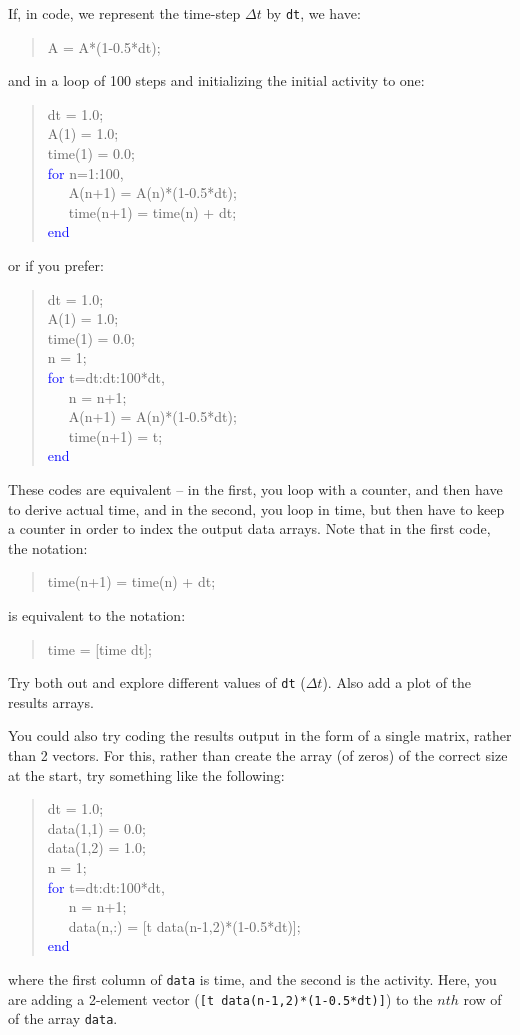 \documentclass{tufte-book} %
\newenvironment{docspec}{\begin{quotation}\ttfamily\parskip0pt\parindent0pt\ignorespaces}{\end{quotation}}
\begin{document}
\noindent If, in code, we represent the time-step \(\Delta t\) by \texttt{dt}, we have:
\begin{docspec}
A = A*(1-0.5*dt);
\end{docspec}
and in a loop of 100 steps and initializing the initial activity to one:
\begin{docspec}
dt = 1.0;\\
A(1) = 1.0;\\
time(1) = 0.0;\\
\textcolor{blue}{for} n=1:100,\\
\ \ \ A(n+1) = A(n)*(1-0.5*dt);\\
\ \ \ time(n+1) = time(n) + dt;\\
\textcolor{blue}{end}
\end{docspec}
or if you prefer:
\begin{docspec}
dt = 1.0;\\
A(1) = 1.0;\\
time(1) = 0.0;\\
n = 1;\\
\textcolor{blue}{for} t=dt:dt:100*dt,\\
\ \ \ n = n+1;\\
\ \ \ A(n+1) = A(n)*(1-0.5*dt);\\
\ \ \ time(n+1) = t;\\
\textcolor{blue}{end}
\end{docspec}
These codes are equivalent -- in the first, you loop with a  counter, and then have to derive actual time, and in the second, you loop in time, but then have to keep a counter in order to index the output data arrays. Note that in the first code, the notation:
\begin{docspec}
time(n+1) = time(n) + dt;
\end{docspec}
is equivalent to the notation:
\begin{docspec}
time = [time dt];
\end{docspec}

\noindent Try both out and explore different values of \texttt{dt} (\(\Delta t\)). Also add a plot of the results arrays.

You could also try coding the results output in the form of a single matrix, rather than 2 vectors. For this, rather than create the array (of zeros) of the correct size at the start, try something like the following:
\begin{docspec}
dt = 1.0;\\
data(1,1) = 0.0;\\
data(1,2) = 1.0;\\
n = 1;\\
\textcolor{blue}{for} t=dt:dt:100*dt,\\
\ \ \ n = n+1;\\
\ \ \ data(n,:) = [t data(n-1,2)*(1-0.5*dt)];\\
\textcolor{blue}{end}
\end{docspec}
where the first column of \texttt{data} is time, and the second is the activity. Here, you are adding a 2-element vector (\small\texttt{[t data(n-1,2)*(1-0.5*dt)]}\normalsize) to the \(nth\) row of of the array \texttt{data}.
\end{document}
